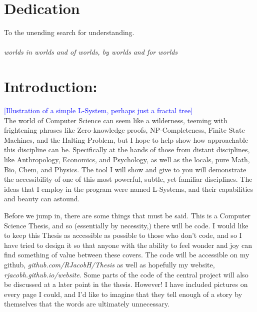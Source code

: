 \documentclass[12pt,twoside]{reedthesis}
\begin{document}
\chapter*{Dedication}
	To the unending search for understanding. \\\\
	\textit{worlds in worlds and of worlds, by worlds and for worlds}

  \mainmatter %
  \pagestyle{fancyplain} %

\chapter{Introduction: }
	
\textcolor{blue}{[Illustration of a simple L-System, perhaps just a fractal tree]}\\

The world of Computer Science can seem like a wilderness, teeming with frightening phrases like Zero-knowledge proofs, NP-Completeness, Finite State Machines, and the Halting Problem, but I hope to help show how approachable this discipline can be. Specifically at the hands of those from distant disciplines, like Anthropology, Economics, and Psychology, as well as the locals, pure Math, Bio, Chem, and Physics. The tool I will show and give to you will demonstrate the accessibility of one of this most powerful, subtle, yet familiar disciplines. The ideas that I employ in the program were named L-Systems, and their capabilities and beauty can astound.
	
Before we jump in, there are some things that must be said. This is a Computer Science Thesis, and so (essentially by necessity,) there will be code. I would like to keep this Thesis as accessible as possible to those who don’t code, and so I have tried to design it so that anyone with the ability to feel wonder and joy can find something of value between these covers. The code will be accessible on my github, \textit{github.com/RJacobH/Thesis} as well as hopefully my website, \textit{rjacobh.github.io/website}. Some parts of the code of the central project will also be discussed at a later point in the thesis. However! I have included pictures on every page I could, and I’d like to imagine that they tell enough of a story by themselves that the words are ultimately unnecessary.\\
\end{document}
